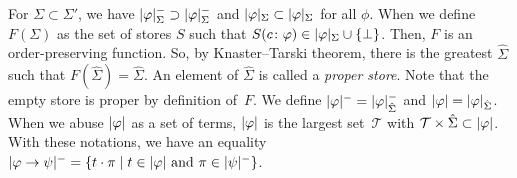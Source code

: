 For $\Sigma\subset \Sigma'$, we have
$|{\varphi}|^-_\Sigma\supset|{\varphi}|^-_\Sigma$
and $|{\varphi}|_\Sigma\subset|{\varphi}|_\Sigma$
for all $\phi$.
When we define $F(\Sigma)$ as the set of stores $S$
such that $S(c\colon\varphi) \in |{\varphi}|_\Sigma\cup\{\bot\}$.
Then, $F$ is an order-preserving function.
So, by Knaster--Tarski theorem,
there is the greatest $\hat\Sigma$ such that $F(\hat\Sigma) =
\hat\Sigma$.
An element of $\hat\Sigma$ is called a \textit{proper store}.
Note that the empty store is proper by definition of~$F$.
We define $|{\varphi}|^- = |{\varphi}|^-_{\hat\Sigma}$
and $|{\varphi}| = |{\varphi}|_{\hat\Sigma}$.
When we abuse $|{\varphi}|$ as a set of terms,
$|{\varphi}|$ is the largest set~$\mathcal T$
with $\mathcal T\times\hat\Sigma\subset|{\varphi}|$.
With these notations, we have an equality
$|{\varphi\rightarrow\psi}|^- = \{t\cdot\pi\mid
t\in|{\varphi}|\text{ and }\pi\in|{\psi}|^-\}$.

